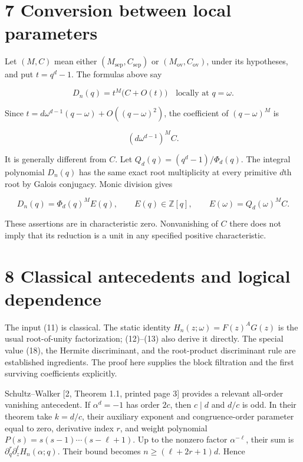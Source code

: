 \documentclass[
  11pt,
]{article}
\begin{document}
\section{7 Conversion between local
parameters}\label{conversion-between-local-parameters}

Let \((M,C)\) mean either \((M_{\mathrm{sep}},C_{\mathrm{sep}})\) or
\((M_{\mathrm{ov}},C_{\mathrm{ov}})\), under its hypotheses, and put
\(t=q^d-1\). The formulas above say

\[
D_n(q)=t^M\bigl(C+O(t)\bigr)\quad\text{locally at }q=\omega. \tag{25}
\]

Since \(t=d\omega^{d-1}(q-\omega)+O((q-\omega)^2)\), the coefficient of
\((q-\omega)^M\) is

\[
(d\omega^{d-1})^M C. \tag{26}
\]

It is generally different from \(C\). Let \(Q_d(q)=(q^d-1)/\Phi_d(q)\).
The integral polynomial \(D_n(q)\) has the same exact root multiplicity
at every primitive \(d\)th root by Galois conjugacy. Monic division
gives

\[
D_n(q)=\Phi_d(q)^M E(q),\qquad E(q)\in\mathbb Z[q],
\qquad E(\omega)=Q_d(\omega)^M C. \tag{27}
\]

These assertions are in characteristic zero. Nonvanishing of \(C\) there
does not imply that its reduction is a unit in any specified positive
characteristic.

\section{8 Classical antecedents and logical
dependence}\label{classical-antecedents-and-logical-dependence}

The input (11) is classical. The static identity
\(H_n(z;\omega)=F(z)^AG(z)\) is the usual root-of-unity factorization;
(12)--(13) also derive it directly. The special value (18), the Hermite
discriminant, and the root-product discriminant rule are established
ingredients. The proof here supplies the block filtration and the first
surviving coefficients explicitly.

Schultz--Walker {[}2, Theorem 1.1, printed page 3{]} provides a relevant
all-order vanishing antecedent. If \(\alpha^d=-1\) has order \(2c\),
then \(c\mid d\) and \(d/c\) is odd. In their theorem take \(k=d/c\),
their auxiliary exponent and congruence-order parameter equal to zero,
derivative index \(r\), and weight polynomial
\(P(s)=s(s-1)\cdots(s-\ell+1)\). Up to the nonzero factor
\(\alpha^{-\ell}\), their sum is
\(\partial_q^r\partial_z^\ell H_n(\alpha;q)\). Their bound becomes
\(n\geq(\ell+2r+1)d\). Hence
\end{document}
